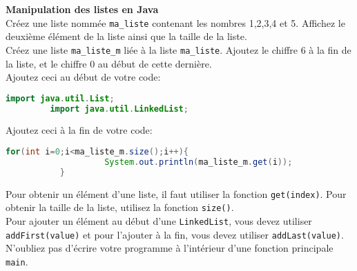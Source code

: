 	\begin{Exercice}[10 minutes] \textbf{Manipulation des listes en Java}\\
      	Créez une liste nommée \lstinline{ma_liste} contenant les nombres 1,2,3,4 et 5. Affichez le deuxième élément de la liste ainsi que la taille de la liste. \\
      	
      	Créez une liste \lstinline{ma_liste_m} liée à la liste \lstinline{ma_liste}. Ajoutez le chiffre 6 à la fin de la liste, et le chiffre 0 au début de cette dernière. \\
      	
      	Ajoutez ceci au début de votre code:
      	\begin{lstlisting}[language=Java]
             import java.util.List;
	     import java.util.LinkedList; \end{lstlisting}
	     
	     Ajoutez ceci à la fin de votre code:
	     
	    \begin{lstlisting}[language=Java]
             for(int i=0;i<ma_liste_m.size();i++){
            		System.out.println(ma_liste_m.get(i));
	       } \end{lstlisting} 
    
        \begin{conseil}
            Pour obtenir un élément d'une liste, il faut utiliser la fonction \lstinline{get(index)}. Pour obtenir la taille de la liste, utilisez la fonction \lstinline{size()}. \\
            
            Pour ajouter un élément au début d'une \lstinline{LinkedList}, vous devez utiliser \lstinline{addFirst(value)} et pour l'ajouter à la fin, vous devez utiliser \lstinline{addLast(value)}. \\
            
           	N'oubliez pas d'écrire votre programme à l'intérieur d'une fonction principale \lstinline{main}. \\
           	
           	
		     
        \end{conseil}
        
        \begin{solution}
            
        \end{solution}
    \end{Exercice}
    \newpage
    
